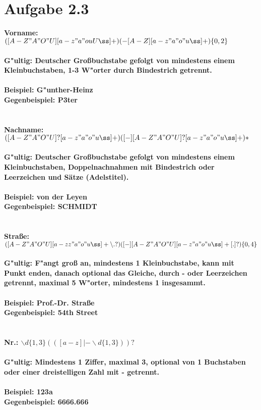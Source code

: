 \documentclass{article}
\date{}
\begin{document}
\section*{Aufgabe 2.3}

\bf{Vorname: }\normalfont $([A-Z"A"O"U][a-z"a"ouUß]+)(-[A-Z][a-z"a"o"uß]+)\lbrace0,2\rbrace$\\
\\
G"ultig: Deutscher Großbuchstabe gefolgt von mindestens einem Kleinbuchstaben, 1-3 W"orter durch Bindestrich getrennt.\\
\\
Beispiel: G"unther-Heinz\\
Gegenbeispiel: P3ter\\
\\
\\
\bf{Nachname: }\normalfont $([A-Z"A"O"U]?[a-z"a"o"uß]+)([- ][A-Z"A"O"U]?[a-z"a"o"uß]+)*$\\
\\
G"ultig: Deutscher Großbuchstabe gefolgt von mindestens einem Kleinbuchstaben, Doppelnachnahmen mit Bindestrich oder Leerzeichen und Sätze (Adelstitel).\\
\\
Beispiel: von der Leyen\\
Gegenbeispiel: SCHMIDT\\
\\
\\
\bf{Straße: }\normalfont $([A-Z"A"O"U][a-zz"a"o"uß]+\backslash.?)([ -][A-Z"A"O"U][a-z"a"o"uß]+[.]?)\lbrace0,4\rbrace$\\
\\
G"ultig: F"angt groß an, mindestens 1 Kleinbuchstabe, kann mit Punkt enden, danach optional das Gleiche, durch - oder Leerzeichen getrennt, maximal 5 W"orter, mindestens 1 insgesammt.\\
\\
Beispiel: Prof.-Dr. Straße\\
Gegenbeispiel: 54th Street\\
\\
\\
\bf{Nr.: }\normalfont $\backslash d\lbrace1,3\rbrace(([a-z]|-\backslash d\lbrace1,3\rbrace))?$\\
\\
G"ultig: Mindestens 1 Ziffer, maximal 3, optional von 1 Buchstaben oder einer dreistelligen Zahl mit - getrennt.\\
\\
Beispiel: 123a\\
Gegenbeispiel: 6666.666\\
\end{document}
